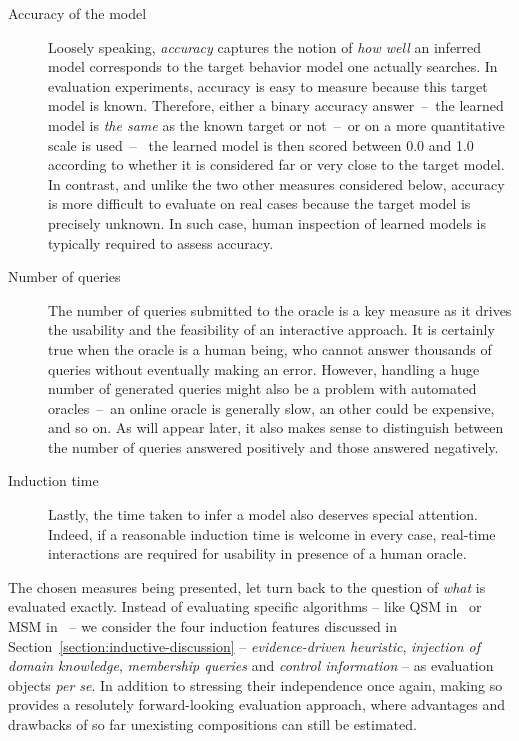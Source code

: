 \begin{description}

\item[Accuracy of the model] Loosely speaking, \emph{accuracy} captures the notion of \emph{how well} an inferred model corresponds to the target behavior model one actually searches. In evaluation experiments, accuracy is easy to measure because this target model is known. Therefore, either a binary accuracy answer~--~the learned model is \emph{the same} as the known target or not~--~or on a more quantitative scale is used~--~ the learned model is then scored between 0.0 and 1.0 according to whether it is considered far or very close to the target model. In contrast, and unlike the two other measures considered below, accuracy is more difficult to evaluate on real cases because the target model is precisely unknown. In such case, human inspection of learned models is typically required to assess accuracy.

\item[Number of queries] The number of queries submitted to the oracle is a key measure as it drives the usability and the feasibility of an interactive approach. It is certainly true when the oracle is a human being, who cannot answer thousands of queries without eventually making an error. However, handling a huge number of generated queries might also be a problem with automated oracles~--~an online oracle is generally slow, an other could be expensive, and so on. As will appear later, it also makes sense to distinguish between the number of queries answered positively and those answered negatively.

\item[Induction time] Lastly, the time taken to infer a model also deserves special attention. Indeed, if a reasonable induction time is welcome in every case, real-time interactions are required for usability in presence of a human oracle.

\end{description}

The chosen measures being presented, let turn back to the question of \emph{what} is evaluated exactly. Instead of evaluating specific algorithms -- like QSM in~\cite{Dupont:2008} or MSM in~\cite{Lambeau:2008} -- we consider the four induction features discussed in Section~\ref{section:inductive-discussion} -- \emph{evidence-driven heuristic}, \emph{injection of domain knowledge}, \emph{membership queries} and \emph{control information} -- as evaluation objects \emph{per se}. In addition to stressing their independence once again, making so provides a resolutely forward-looking evaluation approach, where advantages and drawbacks of so far unexisting compositions can still be estimated.

